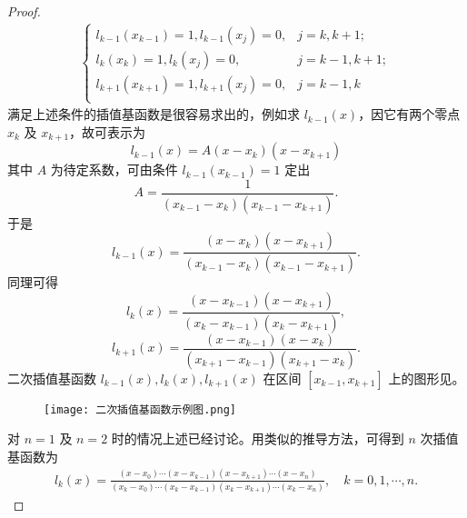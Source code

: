 \documentclass[../../main.tex]{subfiles}
\begin{document}
\begin{proof}
\begin{align*}
\begin{cases}
l_{k-1}(x_{k-1})=1,		l_{k-1}(x_j)=0,		&j=k,k+1;\\
l_k(x_k)=1,		l_k(x_j)=0,		&j=k-1,k+1;\\
l_{k+1}(x_{k+1})=1,		l_{k+1}(x_j)=0,		&j=k-1,k\\
\end{cases}
\end{align*}
满足上述条件的插值基函数是很容易求出的，例如求 $l_{k - 1}(x)$，因它有两个零点 $x_k$ 及 $x_{k + 1}$，故可表示为
\[
l_{k - 1}(x) = A(x - x_k)(x - x_{k + 1})
\]
其中 $A$ 为待定系数，可由条件 $l_{k - 1}(x_{k - 1}) = 1$ 定出 
\[
A = \frac{1}{(x_{k - 1} - x_k)(x_{k - 1} - x_{k + 1})}.
\]
于是
\[
l_{k - 1}(x) = \frac{(x - x_k)(x - x_{k + 1})}{(x_{k - 1} - x_k)(x_{k - 1} - x_{k + 1})}.
\]
同理可得 
\[
l_k(x) = \frac{(x - x_{k - 1})(x - x_{k + 1})}{(x_k - x_{k - 1})(x_k - x_{k + 1})},
\]
\[
l_{k + 1}(x) = \frac{(x - x_{k - 1})(x - x_k)}{(x_{k + 1} - x_{k - 1})(x_{k + 1} - x_k)}.
\]
二次插值基函数 $l_{k - 1}(x), l_k(x), l_{k + 1}(x)$ 在区间 $[x_{k - 1}, x_{k + 1}]$ 上的图形见。
\begin{figure}[H]
\centering
\texttt{[image: 二次插值基函数示例图.png]}
\caption{}
\label{figure:二次插值基函数示例图}
\end{figure}
对 $n = 1$ 及 $n = 2$ 时的情况上述已经讨论。用类似的推导方法，可得到 $n$ 次插值基函数为 
\begin{align*}
l_k(x) = \frac{(x - x_0) \cdots (x - x_{k - 1})(x - x_{k + 1}) \cdots (x - x_n)}{(x_k - x_0) \cdots (x_k - x_{k - 1})(x_k - x_{k + 1}) \cdots (x_k - x_n)}, \quad k = 0, 1, \cdots, n .
\end{align*}

\end{proof}
\end{document}

